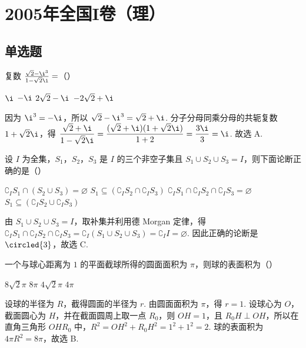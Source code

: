 \chapter{2005年全国I卷（理）}
\section{单选题}
\begin{problem}
复数 \(\frac{\sqrt{2} - \i^3}{1 - \sqrt{2}\i} =\)（\quad）

\choices
    {\(\i\)}
    {\(-\i\)}
    {\(2\sqrt{2} - \i\)}
    {\(-2\sqrt{2} + \i\)}

\begin{solution}
因为 \(\i^3=-\i\)，所以
\(\sqrt{2}-\i^3=\sqrt{2}+\i\). 分子分母同乘分母的共轭复数 \(1+\sqrt{2}\i\)，得
\(\displaystyle\frac{\sqrt{2}+\i}{1-\sqrt{2}\i}=\frac{(\sqrt{2}+\i)(1+\sqrt{2}\i)}{1+2}=\frac{3\i}{3}=\i\). 故选 A.
\end{solution}
\end{problem}

\begin{problem}
设 \(I\) 为全集，\(S_{1}\)，\(S_{2}\)，\(S_{3}\) 是 \(I\) 的三个非空子集且 \(S_{1} \cup S_{2} \cup S_{3} = I\)，则下面论断正确的是（\quad）

\choices
    {\(\complement_{I}S_{1}\cap (S_{2} \cup S_{3}) = \varnothing\)}
    {\(S_{1}\subseteq (\complement_{I}S_{2}\cap \complement_{I}S_{3})\)}
    {\(\complement_{I}S_{1}\cap \complement_{I}S_{2}\cap \complement_{I}S_{3} = \varnothing\)}
    {\(S_{1}\subseteq (\complement_{I}S_{2}\cup \complement_{I}S_{3})\)}

\begin{solution}
由 \(S_{1}\cup S_{2}\cup S_{3}=I\)，取补集并利用德 Morgan 定律，得
\(\complement_{I}S_{1}\cap\complement_{I}S_{2}\cap\complement_{I}S_{3}=\complement_{I}(S_{1}\cup S_{2}\cup S_{3})=\complement_{I}I=\varnothing\). 因此正确的论断是 \(\circled{3}\)，故选 C.
\end{solution}
\end{problem}

\begin{problem}
一个与球心距离为 \(1\) 的平面截球所得的圆面面积为 \(\pi\)，则球的表面积为（\quad）

\choices
    {\(8\sqrt{2}\pi\)}
    {\(8\pi\)}
    {\(4\sqrt{2}\pi\)}
    {\(4\pi\)}

\begin{solution}
设球的半径为 \(R\)，截得圆面的半径为 \(r\). 由圆面面积为 \(\pi\)，得 \(r=1\). 设球心为 \(O\)，截面圆心为 \(H\)，并在截面圆周上取一点 \(R_0\)，则 \(OH=1\)，且 \(R_0H\perp OH\)，所以在直角三角形 \(OHR_0\) 中，\(R^{2}=OH^{2}+R_0H^{2}=1^{2}+1^{2}=2\). 球的表面积为 \(4\pi R^{2}=8\pi\)，故选 B.
\end{solution}
\end{problem}

